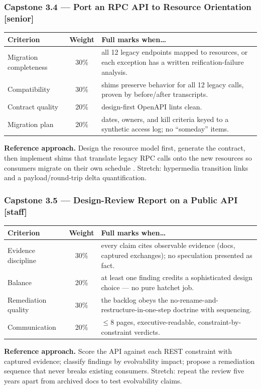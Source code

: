 \subsubsection*{Capstone 3.4 --- Port an RPC API to Resource Orientation [senior]}
\begin{center}\small
\begin{tabularx}{\textwidth}{l c X}
\toprule
\textbf{Criterion} & \textbf{Weight} & \textbf{Full marks when\ldots} \\
\midrule
Migration completeness & 30\% & all 12 legacy endpoints mapped to resources, or each exception has a written reification-failure analysis. \\
Compatibility & 30\% & shims preserve behavior for all 12 legacy calls, proven by before/after transcripts. \\
Contract quality & 20\% & design-first OpenAPI lints clean. \\
Migration plan & 20\% & dates, owners, and kill criteria keyed to a synthetic access log; no ``someday'' items. \\
\bottomrule
\end{tabularx}
\end{center}
\textbf{Reference approach.} Design the resource model first, generate the
contract, then implement shims that translate legacy RPC calls onto the new
resources so consumers migrate on their own schedule
\cite{richardson2013restful}. Stretch: hypermedia transition links and a
payload/round-trip delta quantification.

\subsubsection*{Capstone 3.5 --- Design-Review Report on a Public API [staff]}
\begin{center}\small
\begin{tabularx}{\textwidth}{l c X}
\toprule
\textbf{Criterion} & \textbf{Weight} & \textbf{Full marks when\ldots} \\
\midrule
Evidence discipline & 30\% & every claim cites observable evidence (docs, captured exchanges); no speculation presented as fact. \\
Balance & 20\% & at least one finding credits a sophisticated design choice --- no pure hatchet job. \\
Remediation quality & 30\% & the backlog obeys the no-rename-and-restructure-in-one-step doctrine with sequencing. \\
Communication & 20\% & $\leq$8 pages, executive-readable, constraint-by-constraint verdicts. \\
\bottomrule
\end{tabularx}
\end{center}
\textbf{Reference approach.} Score the API against each REST constraint
with captured evidence; classify findings by evolvability impact; propose a
remediation sequence that never breaks existing consumers. Stretch: repeat
the review five years apart from archived docs to test evolvability claims.

